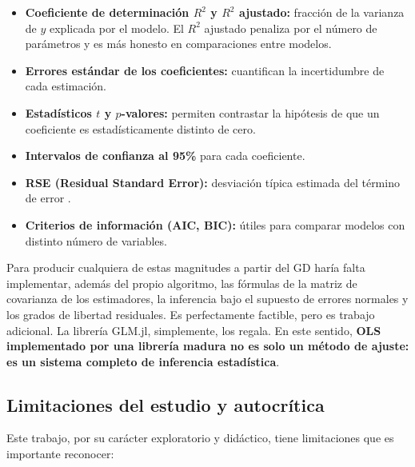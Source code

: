 \documentclass[11pt,a4paper]{article}
\begin{document}
\begin{itemize}
    \item \textbf{Coeficiente de determinación $R^2$ y $R^2$ ajustado:} fracción de la varianza de $y$ explicada por el modelo. El $R^2$ ajustado penaliza por el número de parámetros y es más honesto en comparaciones entre modelos.
    \item \textbf{Errores estándar de los coeficientes:} cuantifican la incertidumbre de cada estimación.
    \item \textbf{Estadísticos $t$ y $p$-valores:} permiten contrastar la hipótesis de que un coeficiente es estadísticamente distinto de cero.
    \item \textbf{Intervalos de confianza al 95\%} para cada coeficiente.
    \item \textbf{RSE (Residual Standard Error):} desviación típica estimada del término de error \cite{astm_calidad}.
    \item \textbf{Criterios de información (AIC, BIC):} útiles para comparar modelos con distinto número de variables.
\end{itemize}

Para producir cualquiera de estas magnitudes a partir del GD haría falta implementar, además del propio algoritmo, las fórmulas de la matriz de covarianza de los estimadores, la inferencia bajo el supuesto de errores normales y los grados de libertad residuales. Es perfectamente factible, pero es trabajo adicional. La librería GLM.jl, simplemente, los regala. En este sentido, \textbf{OLS implementado por una librería madura no es solo un método de ajuste: es un sistema completo de inferencia estadística}.

\subsection{Limitaciones del estudio y autocrítica}

Este trabajo, por su carácter exploratorio y didáctico, tiene limitaciones que es importante reconocer:
\end{document}
